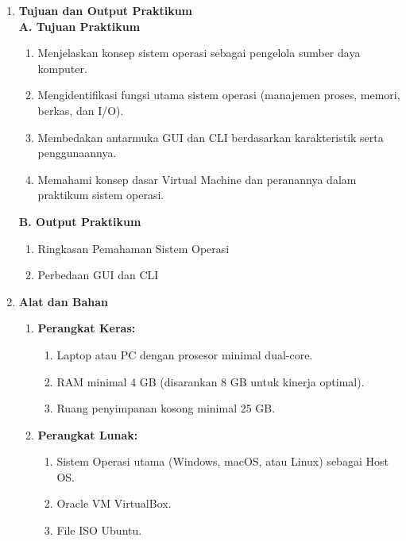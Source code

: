 \begin{enumerate}
    \item \textbf{Tujuan dan Output Praktikum}\\[0.3cm]
    \textbf{A. Tujuan Praktikum}
    \begin{enumerate}[nosep]
        \item Menjelaskan konsep sistem operasi sebagai pengelola sumber daya komputer.
        \item Mengidentifikasi fungsi utama sistem operasi (manajemen proses, memori, berkas, dan I/O).
        \item Membedakan antarmuka GUI dan CLI berdasarkan karakteristik serta penggunaannya.
        \item Memahami konsep dasar Virtual Machine dan peranannya dalam praktikum sistem operasi.
    \end{enumerate}
    \textbf{B. Output Praktikum}
    \begin{enumerate}[nosep]
        \item Ringkasan Pemahaman Sistem Operasi
        \item Perbedaan GUI dan CLI
    \end{enumerate}

    \item \textbf{Alat dan Bahan}
    \begin{enumerate}[nosep]
        \item \textbf{Perangkat Keras:}
        \begin{enumerate}[nosep]
            \item Laptop atau PC dengan prosesor minimal dual-core.
            \item RAM minimal 4 GB (disarankan 8 GB untuk kinerja optimal).
            \item Ruang penyimpanan kosong minimal 25 GB.
        \end{enumerate}
        \item \textbf{Perangkat Lunak:}
        \begin{enumerate}[nosep]
            \item Sistem Operasi utama (Windows, macOS, atau Linux) sebagai Host OS.
            \item Oracle VM VirtualBox.
            \item File ISO Ubuntu.
        \end{enumerate}
    \end{enumerate}


\end{enumerate}
